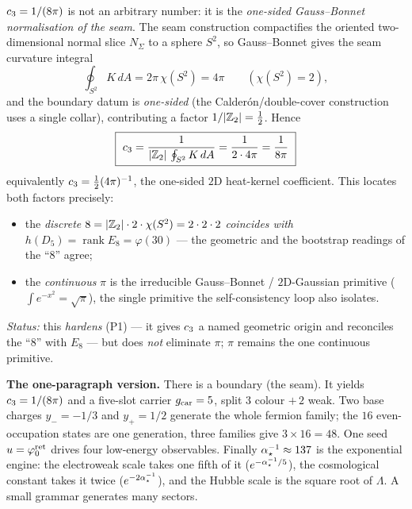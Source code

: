 \begin{keybox}[Hardening (P1): the Gauss--Bonnet origin of $c_3=\tfrac1{8\pi}$]
$c_3=1/(8\pi)$ is not an arbitrary number: it is the \emph{one-sided Gauss--Bonnet normalisation of
the seam}. The seam construction compactifies the oriented two-dimensional normal slice $N_\Sigma$ to a sphere $S^2$,
so Gauss--Bonnet gives the seam curvature integral
\[
  \oint_{S^2}K\,dA=2\pi\,\chi(S^2)=4\pi\qquad(\chi(S^2)=2),
\]
and the boundary datum is \emph{one-sided} (the Calder\'on/double-cover construction uses a single
collar), contributing a factor $1/|\mathbb{Z}_2|=\tfrac12$. Hence
\[
  \boxed{\ \cthree=\frac{1}{|\Z_2|\,\oint_{S^2}K\,dA}=\frac{1}{2\cdot 4\pi}=\frac{1}{8\pi}\ }
\]
\noindent equivalently $c_3=\tfrac12(4\pi)^{-1}$, the one-sided $2$D heat-kernel coefficient.
This locates both factors precisely:
\begin{itemize}\setlength\itemsep{1pt}
\item the \emph{discrete} $8=|\mathbb{Z}_2|\cdot2\cdot\chi(S^2)=2\cdot2\cdot2$ \emph{coincides with} $h(D_5)=\operatorname{rank}E_8=\varphi(30)$
--- the geometric and the bootstrap readings of the ``$8$'' agree;
\item the \emph{continuous} $\pi$ is the irreducible Gauss--Bonnet / $2$D-Gaussian primitive ($\int e^{-x^2}=\sqrt\pi$), the single primitive the self-consistency loop also isolates.
\end{itemize}
\emph{Status:} this \emph{hardens} (P1) --- it gives $c_3$ a named geometric origin and reconciles the
``$8$'' with $E_8$ --- but does \emph{not} eliminate $\pi$; $\pi$ remains the one continuous primitive. \mC
\end{keybox}

\par\medskip
\noindent\textbf{The one-paragraph version.}
There is a boundary (the seam). It yields $c_3=1/(8\pi)$ and a five-slot carrier $g_{\mathrm{car}}=5$,
split $3$ colour $+\,2$ weak. Two base charges $y_-=-1/3$ and $y_+=1/2$ generate the whole
fermion family; the $16$ even-occupation states are one generation, three families give
$3\times16=48$. One seed $u=\varphi^{\mathrm{ret}}_0$ drives four low-energy observables. Finally
$\alpha^{-1}_\star\approx137$ is the exponential engine: the electroweak scale takes one fifth of it
($e^{-\alpha^{-1}_\star/5}$), the cosmological constant takes it twice ($e^{-2\alpha^{-1}_\star}$), and the Hubble scale is
the square root of $\Lambda$. A small grammar generates many sectors.
\par\medskip

